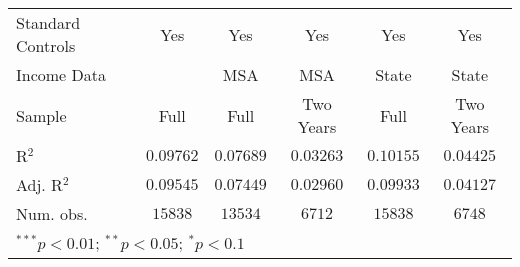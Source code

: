 \begin{tabular}{l c c c c c}
\hline
Standard Controls    & Yes               & Yes               & Yes              & Yes               & Yes              \\
Income Data          &                   & MSA               & MSA              & State             & State            \\
Sample               & Full              & Full              & Two Years        & Full              & Two Years        \\
R$^2$                & $0.09762$         & $0.07689$         & $0.03263$        & $0.10155$         & $0.04425$        \\
Adj. R$^2$           & $0.09545$         & $0.07449$         & $0.02960$        & $0.09933$         & $0.04127$        \\
Num. obs.            & $15838$           & $13534$           & $6712$           & $15838$           & $6748$           \\
\hline
\multicolumn{6}{l}{\scriptsize{$^{***}p<0.01$; $^{**}p<0.05$; $^{*}p<0.1$}}
\end{tabular}

